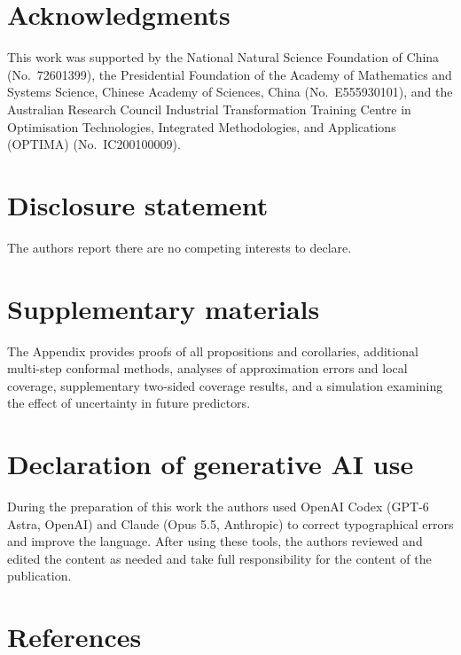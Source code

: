 \documentclass[
  american,
  12pt]{article}
\theoremstyle{plain}
\theoremstyle{plain}
\theoremstyle{remark}
\begin{document}
\section*{Acknowledgments}\label{acknowledgments}

This work was supported by the National Natural Science Foundation of
China (No.~72601399), the Presidential Foundation of the Academy of
Mathematics and Systems Science, Chinese Academy of Sciences, China
(No.~E555930101), and the Australian Research Council Industrial
Transformation Training Centre in Optimisation Technologies, Integrated
Methodologies, and Applications (OPTIMA) (No.~IC200100009).

\section*{Disclosure statement}\label{disclosure-statement}

The authors report there are no competing interests to declare.

\section*{Supplementary materials}\label{supplementary-materials}

The Appendix provides proofs of all propositions and corollaries,
additional multi-step conformal methods, analyses of approximation
errors and local coverage, supplementary two-sided coverage results, and
a simulation examining the effect of uncertainty in future predictors.

\section*{Declaration of generative AI
use}\label{declaration-of-generative-ai-use}

During the preparation of this work the authors used OpenAI Codex (GPT-6
Astra, OpenAI) and Claude (Opus 5.5, Anthropic) to correct typographical
errors and improve the language. After using these tools, the authors
reviewed and edited the content as needed and take full responsibility
for the content of the publication.

\section*{References}\label{references}
\end{document}
